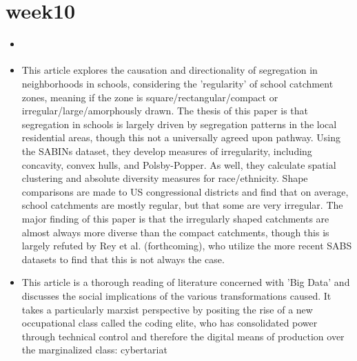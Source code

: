 \documentclass{article}
\begin{document}
\section{week10}
\begin{itemize}
\item \cite{saporito2016IrregularlyShaped}
\item This article explores the causation and directionality of segregation in neighborhoods in schools, considering the 'regularity' of school catchment zones, meaning if the zone is square/rectangular/compact or irregular/large/amorphously drawn. The thesis of this paper is that segregation in schools is largely driven by segregation patterns in the local residential areas, though this not a universally agreed upon pathway. Using the SABINs dataset, they develop measures of irregularity, including concavity, convex hulls, and Polsby-Popper. As well, they calculate spatial clustering and absolute diversity measures for race/ethnicity. Shape comparisons are made to US congressional districts and find that on average, school catchments are mostly regular, but that some are very irregular. The major finding of this paper is that the irregularly shaped catchments are almost always more diverse than the compact catchments, though this is largely refuted by Rey et al. (forthcoming), who utilize the more recent SABS datasets to find that this is not always the case. 


\item \cite{burrell2021SocietyAlgorithms}
This article is a thorough reading of literature concerned with 'Big Data' and discusses the social implications of the various transformations caused. It takes a particularly marxist perspective by positing the rise of a new occupational class called the coding elite, who has consolidated power through technical control and therefore the digital means of production over the marginalized class: cybertariat
  

\end{itemize}
\end{document}
